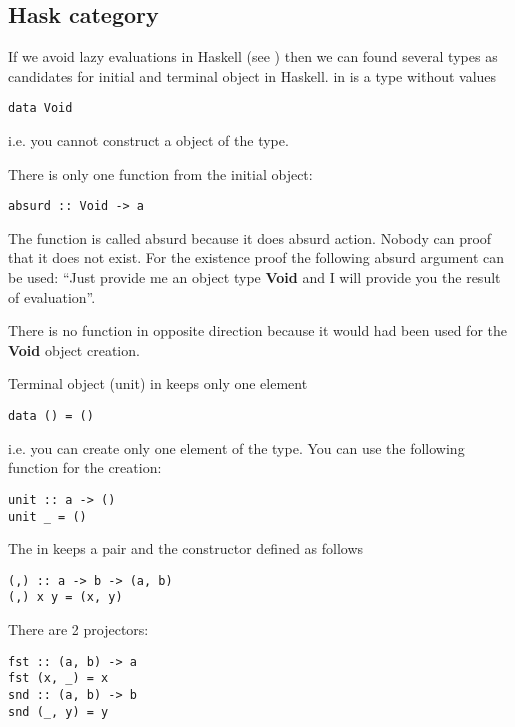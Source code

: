 \subsection{\textbf{Hask} category}
\begin{example}
If we avoid lazy evaluations in Haskell (see
) then we can found several types
as candidates for initial and terminal object in Haskell. 
\label{ex:hask_initial_object}
 in  is a
type without values 
\begin{verbatim}
data Void
\end{verbatim}
i.e. you cannot construct a object of the type.

There is only one function from the initial object:
\begin{verbatim}
absurd :: Void -> a
\end{verbatim}
The function is called absurd because it does absurd action. Nobody
can proof that it does not exist. For the existence proof the
following absurd argument can be used: ``Just provide me an object type
\textbf{Void} and I will provide you the result of
evaluation''.  

There is no function in opposite direction because it would had been
used for the \textbf{Void} object creation. 
\end{example}

\begin{example}
\label{ex:hask_terminal_object}
Terminal object (unit) in  keeps only one element
\begin{verbatim}
data () = ()
\end{verbatim}
i.e. you can create only one element of the type. You can use the
following function for the creation:
\begin{verbatim}
unit :: a -> ()
unit _ = ()
\end{verbatim}
\end{example}

\begin{example}
\label{ex:hask_product}
The  in  keeps a
pair and the constructor defined as follows
\begin{verbatim}
(,) :: a -> b -> (a, b)
(,) x y = (x, y)
\end{verbatim}
There are 2 projectors: 
\begin{verbatim}
fst :: (a, b) -> a
fst (x, _) = x
snd :: (a, b) -> b
snd (_, y) = y
\end{verbatim}
\end{example}


